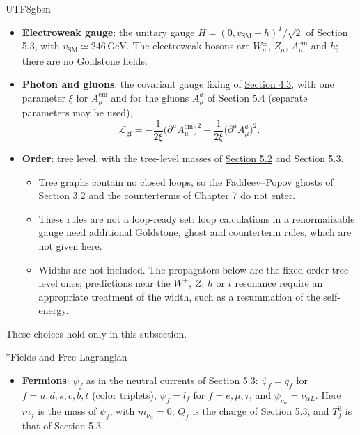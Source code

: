 \documentclass[11pt,a4paper,oneside]{report}
\makeatletter
\newcommand\topic{\@startsection{paragraph}{4}{\z@}{-1.7ex plus -.3ex}{.5ex}{\normalfont\normalsize\bfseries\itshape\boldmath}*}
\makeatother
\begin{document}
\begin{CJK*}{UTF8}{gbsn}
\begin{itemize}
\item \textbf{\boldmath Electroweak gauge}: the unitary gauge $H=(0,v_{\mathrm{SM}}+h)^T/\sqrt2$ of Section 5.3, with $v_{\mathrm{SM}}\simeq246\,\mathrm{GeV}$. The electroweak bosons are $W^\pm_\mu$, $Z_\mu$, $A^{\mathrm{em}}_\mu$ and $h$; there are no Goldstone fields.

\item \textbf{\boldmath Photon and gluons}: the covariant gauge fixing of \hyperref[feynman-diagrams]{Section 4.3}, with one parameter $\xi$ for $A^{\mathrm{em}}_\mu$ and for the gluons $A^a_\mu$ of Section 5.4 (separate parameters may be used),
\begin{equation*}
\mathcal L_{\mathrm{gf}}=-\frac1{2\xi}\bigl(\partial^\mu A^{\mathrm{em}}_\mu\bigr)^2-\frac1{2\xi}\bigl(\partial^\mu A^a_\mu\bigr)^2 .
\tag{A.1}\label{eq:A.1}
\end{equation*}

\item \textbf{\boldmath Order}: tree level, with the tree-level masses of \hyperref[sm-fermions]{Section 5.2} and Section 5.3.
\begin{itemize}


\item Tree graphs contain no closed loops, so the Faddeev--Popov ghosts of \hyperref[path-integrals-in-field-theory]{Section 3.2} and the counterterms of \hyperref[qft-ch7]{Chapter 7} do not enter.

\item These rules are not a loop-ready set: loop calculations in a renormalizable gauge need additional Goldstone, ghost and counterterm rules, which are not given here.

\item Widths are not included. The propagators below are the fixed-order tree-level ones; predictions near the $W^\pm$, $Z$, $h$ or $t$ resonance require an appropriate treatment of the width, such as a resummation of the self-energy.
\end{itemize}

\end{itemize}


These choices hold only in this subsection.

\topic{Fields and Free Lagrangian}
\begin{itemize}


\item \textbf{\boldmath Fermions}: $\psi_f$ as in the neutral currents of Section 5.3: $\psi_f=q_f$ for $f=u,d,s,c,b,t$ (color triplets), $\psi_f=l_f$ for $f=e,\mu,\tau$, and $\psi_{\nu_\alpha}=\nu_{\alpha L}$. Here $m_f$ is the mass of $\psi_f$, with $m_{\nu_\alpha}=0$; $Q_f$ is the charge of \hyperref[qed]{Section 5.3}, and $T_f^3$ is that of Section 5.3.


\end{itemize}
\end{CJK*}
\end{document}
